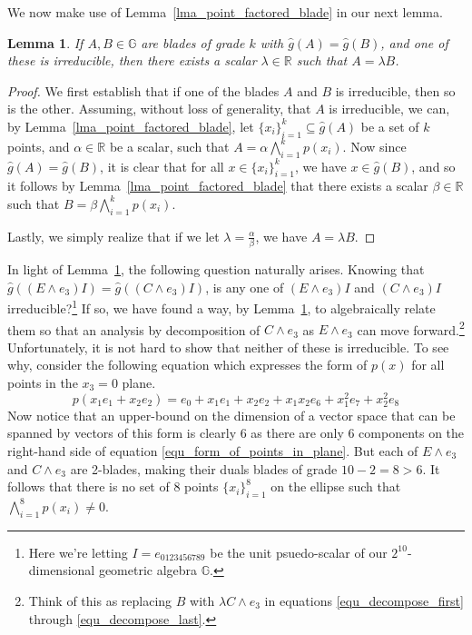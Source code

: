 \documentclass{birkjour}
\newtheorem{lem}[thm]{Lemma}
\theoremstyle{definition}
\theoremstyle{remark}
\numberwithin{equation}{section}
\newcommand{\R}{\mathbb{R}}
\newcommand{\G}{\mathbb{G}}
\newcommand{\gh}{\hat{g}}
\begin{document}
We now make use of Lemma~\ref{lma_point_factored_blade} in our next lemma.
\begin{lem}\label{lma_equating_blades}
If $A,B\in\G$ are blades of grade $k$ with $\gh(A)=\gh(B)$, and one of these is irreducible,
then there exists a scalar $\lambda\in\R$ such that $A=\lambda B$.
\end{lem}
\begin{proof}
We first establish that if one of the blades $A$ and $B$ is irreducible, then so is the other.
Assuming, without loss of generality, that $A$ is irreducible, we can,
by Lemma~\ref{lma_point_factored_blade}, let $\{x_i\}_{i=1}^k\subseteq\gh(A)$
be a set of $k$ points, and $\alpha\in\R$ be a scalar, such that $A=\alpha\bigwedge_{i=1}^k p(x_i)$.
Now since $\gh(A)=\gh(B)$, it is clear that for all $x\in\{x_i\}_{i=1}^k$, we have $x\in\gh(B)$,
and so it follows by Lemma~\ref{lma_point_factored_blade} that there exists a scalar $\beta\in\R$
such that $B=\beta\bigwedge_{i=1}^k p(x_i)$.

Lastly, we simply realize that if we let $\lambda=\frac{\alpha}{\beta}$, we have
$A=\lambda B$.
\end{proof}

In light of Lemma~\ref{lma_equating_blades}, the following question naturally arises.
Knowing that $\gh((E\wedge e_3)I)=\gh((C\wedge e_3)I)$, is any one of
$(E\wedge e_3)I$ and $(C\wedge e_3)I$ irreducible?\footnote{Here we're letting $I=e_{0123456789}$
be the unit psuedo-scalar of our $2^{10}$-dimensional geometric algebra $\G$.}  If so, we have found
a way, by Lemma~\ref{lma_equating_blades}, to algebraically relate them so that an analysis
by decomposition of $C\wedge e_3$
as $E\wedge e_3$ can move forward.\footnote{Think of this as replacing
$B$ with $\lambda C\wedge e_3$ in equations \eqref{equ_decompose_first} through
\eqref{equ_decompose_last}.}
Unfortunately, it is not hard to show
that neither of these is irreducible.  To see why, consider the following equation which
expresses the form of $p(x)$ for all points in the $x_3=0$ plane.
\begin{equation}\label{equ_form_of_points_in_plane}
p(x_1e_1 + x_2e_2) = e_0 + x_1e_1 + x_2e_2 + x_1x_2e_6 + x_1^2e_7 + x_2^2e_8
\end{equation}
Now notice that an upper-bound on the dimension of a vector space that can
be spanned by vectors of this form is clearly 6 as there are only 6 components
on the right-hand side of equation \eqref{equ_form_of_points_in_plane}.
But each of $E\wedge e_3$ and $C\wedge e_3$ are 2-blades, making their
duals blades of grade $10-2=8>6$.  It follows that there is no set of 8 points $\{x_i\}_{i=1}^8$
on the ellipse such that $\bigwedge_{i=1}^8 p(x_i)\neq 0$.
\end{document}
